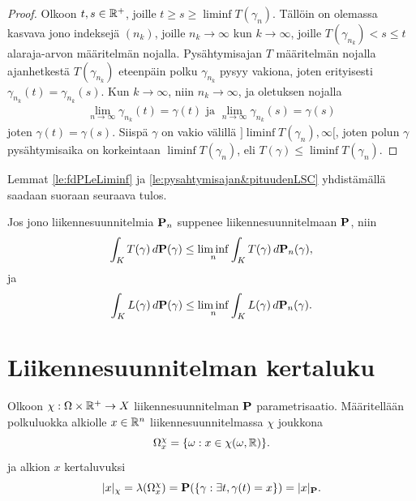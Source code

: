 \documentclass[12pt,oneside,a4paper]{amsbook} %
\begin{document}
\begin{proof}
    Olkoon $t, s \in \Rp$, joille $t \ge s \ge \liminf T(\gamma_n)$. Tällöin on olemassa kasvava jono indeksejä $(n_k)$, joille $n_k \to \infty$ kun $k \to \infty$, joille $T(\gamma_{n_k}) < s \le t$ alaraja-arvon määritelmän nojalla. Pysähtymisajan $T$ määritelmän nojalla ajanhetkestä $T(\gamma_{n_k})$ eteenpäin polku $\gamma_{n_k}$ pysyy vakiona, joten erityisesti $\gamma_{n_k}(t) = \gamma_{n_k}(s)$. Kun $k \to \infty$, niin $n_k \to \infty$, ja oletuksen nojalla
    \begin{align*}
        \lim_{n\to \infty} \gamma_{n_k}(t) = \gamma(t) \text{ ja } \lim_{n\to \infty} \gamma_{n_k}(s) = \gamma(s)
    \end{align*}
    joten $\gamma(t) = \gamma(s)$. Siispä $\gamma$ on vakio välillä $]\liminf T(\gamma_n), \infty[$, joten polun $\gamma$ pysähtymisaika on korkeintaan $\liminf T(\gamma_n)$, eli $T(\gamma) \le \liminf T(\gamma_n)$.
    
\end{proof}

Lemmat \ref{le:fdPLeLiminf} ja \ref{le:pysahtymisajan&pituudenLSC} yhdistämällä saadaan suoraan seuraava tulos.
\begin{corollary}\label{le:keskipysahtymisajan&pituudenLSC}
    Jos jono liikennesuunnitelmia $\P_n$ suppenee liikennesuunnitelmaan $\P$, niin 
    \begin{equation*}
        \int_K T(\gamma) \, d\P(\gamma) \le \liminf_n \int_K T(\gamma) \, d\P_n(\gamma),
    \end{equation*}
    ja
    \begin{equation*}
        \int_K L(\gamma) \, d\P(\gamma) \le \liminf_n \int_K L(\gamma) \, d\P_n(\gamma).
    \end{equation*}
\end{corollary}

\section{Liikennesuunnitelman kertaluku}

\begin{definition}
Olkoon $\chi : \Omega \times \R^+ \to X$ liikennesuunnitelman $\P$ parametrisaatio. Määritellään polkuluokka alkiolle $x\in \R^n$ liikennesuunnitelmassa $\chi$ joukkona
\begin{equation*}
    \Omega_x^\chi = \{\omega : x \in \chi(\omega, \R)\}.
\end{equation*}
ja alkion $x$ kertaluvuksi
    \begin{equation*}
        |x|_\chi = \lambda(\Omega_x^\chi) = \P(\{\gamma : \exists t, \gamma(t) = x\}) = |x|_\P.
    \end{equation*}
\end{definition}
\end{document}
